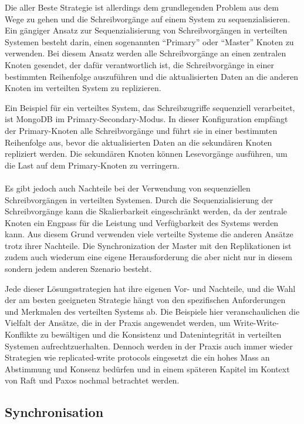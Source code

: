 \documentclass[../vs-script-first-v01.tex]{subfiles}
\begin{document}
Die aller Beste Strategie ist allerdings dem grundlegenden Problem aus dem Wege zu gehen und die Schreibvorgänge auf einem System zu sequenzialisieren. Ein gängiger Ansatz zur Sequenzialisierung von Schreibvorgängen in verteilten Systemen besteht darin, einen sogenannten \enquote{Primary} oder \enquote{Master} Knoten zu verwenden. Bei diesem Ansatz werden alle Schreibvorgänge an einen zentralen Knoten gesendet, der dafür verantwortlich ist, die Schreibvorgänge in einer bestimmten Reihenfolge auszuführen und die aktualisierten Daten an die anderen Knoten im verteilten System zu replizieren.

Ein Beispiel für ein verteiltes System, das Schreibzugriffe sequenziell verarbeitet, ist MongoDB im Primary-Secondary-Modus. In dieser Konfiguration empfängt der Primary-Knoten alle Schreibvorgänge und führt sie in einer bestimmten Reihenfolge aus, bevor die aktualisierten Daten an die sekundären Knoten repliziert werden. Die sekundären Knoten können Lesevorgänge ausführen, um die Last auf dem Primary-Knoten zu verringern.
\\\\
Es gibt jedoch auch Nachteile bei der Verwendung von sequenziellen Schreibvorgängen in verteilten Systemen. Durch die Sequenzialisierung der Schreibvorgänge kann die Skalierbarkeit eingeschränkt werden, da der zentrale Knoten ein Engpass für die Leistung und Verfügbarkeit des Systems werden kann. Aus diesem Grund verwenden viele verteilte Systeme die anderen Ansätze trotz ihrer Nachteile. Die Synchronization der Master mit den Replikationen ist zudem auch wiederum eine eigene Herausforderung die aber nicht nur in diesem sondern jedem anderen Szenario besteht.  

Jede dieser Lösungsstrategien hat ihre eigenen Vor- und Nachteile, und die Wahl der am besten geeigneten Strategie hängt von den spezifischen Anforderungen und Merkmalen des verteilten Systems ab. Die Beispiele hier veranschaulichen die Vielfalt der Ansätze, die in der Praxis angewendet werden, um Write-Write-Konflikte zu bewältigen und die Konsistenz und Datenintegrität in verteilten Systemen aufrechtzuerhalten. Dennoch werden in der Praxis auch immer wieder Strategien wie replicated-write protocols eingesetzt die ein hohes Mass an Abstimmung und Konsenz bedürfen und in einem späteren Kapitel im Kontext von Raft und Paxos nochmal betrachtet werden.  



	



\subsection{Synchronisation}
\end{document}
